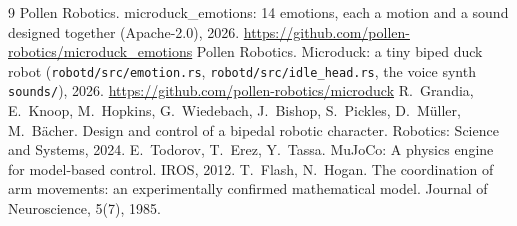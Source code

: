 \documentclass[11pt]{article}
\newcommand{\code}[1]{\texttt{\small #1}}
\begin{document}
\begin{thebibliography}{9}
 Pollen Robotics. microduck\_emotions: 14 emotions, each a motion and a sound designed together
  (Apache-2.0), 2026. \url{https://github.com/pollen-robotics/microduck_emotions}
 Pollen Robotics. Microduck: a tiny biped duck robot (\code{robotd/src/emotion.rs},
  \code{robotd/src/idle\_head.rs}, the voice synth \code{sounds/}), 2026.
  \url{https://github.com/pollen-robotics/microduck}
 R.~Grandia, E.~Knoop, M.~Hopkins, G.~Wiedebach, J.~Bishop, S.~Pickles, D.~M\"uller, M.~B\"acher.
  Design and control of a bipedal robotic character. Robotics: Science and Systems, 2024.
 E.~Todorov, T.~Erez, Y.~Tassa. MuJoCo: A physics engine for model-based control. IROS, 2012.
 T.~Flash, N.~Hogan. The coordination of arm movements: an experimentally confirmed mathematical
  model. Journal of Neuroscience, 5(7), 1985.
\end{thebibliography}
\end{document}
